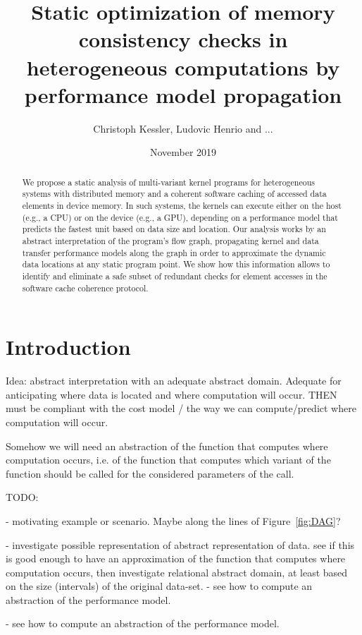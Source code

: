 \documentclass{article}
\title{Static optimization of memory consistency checks in heterogeneous computations by performance model propagation}
\author{Christoph Kessler, Ludovic Henrio and ... }
\date{November 2019}
\begin{document}
\maketitle

\begin{abstract}
    We propose a static analysis of multi-variant kernel programs for
    heterogeneous systems with distributed memory
    and a coherent software caching of accessed
    data elements in device memory.
    In such systems, the kernels can execute either
    on the host (e.g., a CPU) or on the device
    (e.g., a GPU), depending on a performance
    model that predicts the fastest unit based
    on data size and location.
    Our analysis works by an abstract interpretation
    of the program's flow graph, propagating 
    kernel and data transfer performance models 
    along the graph in order to approximate the
    dynamic data locations at any static program point.
    We show how this information
    allows to identify and 
    eliminate a safe subset of redundant
    checks for element accesses in the software
    cache coherence protocol.
    
\end{abstract}
\section{Introduction}

Idea: abstract interpretation with an adequate abstract domain.
Adequate for anticipating where data is located and where computation will occur.
THEN must be compliant with the cost model / the way we can compute/predict where computation will occur.

Somehow we will need an abstraction of the function that computes where computation occurs, i.e. of the function that computes which variant of the function should be called for the considered parameters of the call.

TODO:

- motivating example or scenario. 
Maybe along the lines of Figure~\ref{fig:DAG}?

- investigate possible representation of abstract representation of data. see if this is good enough to have an approximation of the function that computes where computation occurs, then investigate relational abstract domain, at least based on the size (intervals) of the original data-set.
- see how to compute an abstraction of the performance model.


- see how to compute an abstraction of the performance model.
\end{document}
